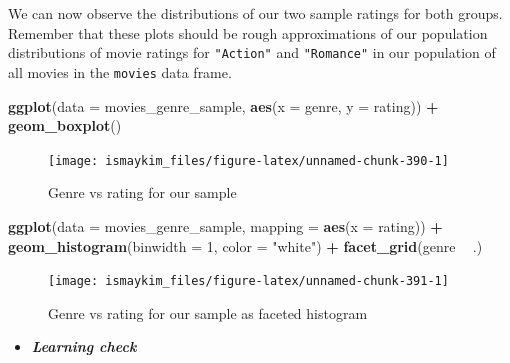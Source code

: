 \documentclass[12pt,]{krantz}
\makeatletter
\newenvironment{Shaded}{\begin{snugshade}}{\end{snugshade}}
\newcommand{\KeywordTok}[1]{\textcolor[rgb]{0.27,0.27,0.27}{\textbf{#1}}}
\newcommand{\DataTypeTok}[1]{\textcolor[rgb]{0.27,0.27,0.27}{#1}}
\newcommand{\DecValTok}[1]{\textcolor[rgb]{0.06,0.06,0.06}{#1}}
\newcommand{\StringTok}[1]{\textcolor[rgb]{0.5,0.5,0.5}{#1}}
\newcommand{\OperatorTok}[1]{\textcolor[rgb]{0.43,0.43,0.43}{\textbf{#1}}}
\newcommand{\NormalTok}[1]{#1}
\newenvironment{kframe}{%
\medskip{}
\setlength{\fboxsep}{.8em}
 \def\at@end@of@kframe{}%
 \ifinner\ifhmode%
  \def\at@end@of@kframe{\end{minipage}}%
  \begin{minipage}{\columnwidth}%
 \fi\fi%
 \def\FrameCommand##1{\hskip\@totalleftmargin \hskip-\fboxsep
 \colorbox{shadecolor}{##1}\hskip-\fboxsep
     \hskip-\linewidth \hskip-\@totalleftmargin \hskip\columnwidth}%
 \MakeFramed {\advance\hsize-\width
   \@totalleftmargin\z@ \linewidth\hsize
   \@setminipage}}%
 {\par\unskip\endMakeFramed%
 \at@end@of@kframe}
\renewenvironment{Shaded}{\begin{kframe}}{\end{kframe}}
\newenvironment{rmdblock}[1]
  {\begin{shaded*}
  \begin{itemize}
  \renewcommand{\labelitemi}{
    \raisebox{-.7\height}[0pt][0pt]{
    }
  }
  \item
  }
  {
  \end{itemize}
  \end{shaded*}
  }
\newenvironment{learncheck}
  {\begin{rmdblock}{warning}}
  {\end{rmdblock}}
\theoremstyle{definition}
\theoremstyle{definition}
\theoremstyle{definition}
\theoremstyle{remark}
\makeatother
\begin{document}
We can now observe the distributions of our two sample ratings for both
groups. Remember that these plots should be rough approximations of our
population distributions of movie ratings for \texttt{"Action"} and
\texttt{"Romance"} in our population of all movies in the
\texttt{movies} data frame.

\begin{Shaded}
\begin{Highlighting}[]
\KeywordTok{ggplot}\NormalTok{(}\DataTypeTok{data =}\NormalTok{ movies_genre_sample, }\KeywordTok{aes}\NormalTok{(}\DataTypeTok{x =}\NormalTok{ genre, }\DataTypeTok{y =}\NormalTok{ rating)) }\OperatorTok{+}
\StringTok{  }\KeywordTok{geom_boxplot}\NormalTok{()}
\end{Highlighting}
\end{Shaded}

\begin{figure}

{\centering \texttt{[image: ismaykim\_files/figure-latex/unnamed-chunk-390-1]} 

}

\caption{Genre vs rating for our sample}\label{fig:unnamed-chunk-390}
\end{figure}

\begin{Shaded}
\begin{Highlighting}[]
\KeywordTok{ggplot}\NormalTok{(}\DataTypeTok{data =}\NormalTok{ movies_genre_sample, }\DataTypeTok{mapping =} \KeywordTok{aes}\NormalTok{(}\DataTypeTok{x =}\NormalTok{ rating)) }\OperatorTok{+}
\StringTok{  }\KeywordTok{geom_histogram}\NormalTok{(}\DataTypeTok{binwidth =} \DecValTok{1}\NormalTok{, }\DataTypeTok{color =} \StringTok{"white"}\NormalTok{) }\OperatorTok{+}
\StringTok{  }\KeywordTok{facet_grid}\NormalTok{(genre }\OperatorTok{~}\StringTok{ }\NormalTok{.)}
\end{Highlighting}
\end{Shaded}

\begin{figure}

{\centering \texttt{[image: ismaykim\_files/figure-latex/unnamed-chunk-391-1]} 

}

\caption{Genre vs rating for our sample as faceted histogram}\label{fig:unnamed-chunk-391}
\end{figure}

\begin{learncheck}
\textbf{\emph{Learning check}}
\end{learncheck}
\end{document}
